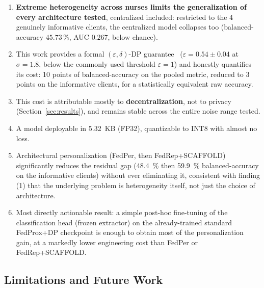 \documentclass{acmart}
\begin{document}
\begin{enumerate}[leftmargin=1.2em]
\item \textbf{Extreme heterogeneity across nurses limits the generalization of every
architecture tested}, centralized included: restricted to the 4 genuinely informative
clients, the centralized model collapses too (balanced-accuracy $45.73\,\%$, AUC
$0.267$, below chance).
\item This work provides a formal $(\varepsilon,\delta)$-DP guarantee~\cite{dwork2014foundations}
($\varepsilon=0.54\pm0.04$ at $\sigma=1.8$, below the commonly used threshold
$\varepsilon=1$) and honestly quantifies its cost: 10 points of balanced-accuracy on
the pooled metric, reduced to 3 points on the informative clients, for a statistically
equivalent raw accuracy.
\item This cost is attributable mostly to \textbf{decentralization}, not to privacy
(Section~\ref{sec:results}), and remains stable across the entire noise range tested.
\item A model deployable in 5.32~KB (FP32), quantizable to INT8 with almost no loss.
\item Architectural personalization (FedPer, then FedRep+SCAFFOLD) significantly
reduces the residual gap (48.4~\% then 59.9~\% balanced-accuracy on the informative
clients) without ever eliminating it, consistent with finding (1) that the underlying
problem is heterogeneity itself, not just the choice of architecture.
\item Most directly actionable result: a simple post-hoc fine-tuning of the
classification head (frozen extractor) on the already-trained standard FedProx+DP
checkpoint is enough to obtain most of the personalization gain, at a markedly lower
engineering cost than FedPer or FedRep+SCAFFOLD.
\end{enumerate}

\subsection{Limitations and Future Work}
\end{document}
